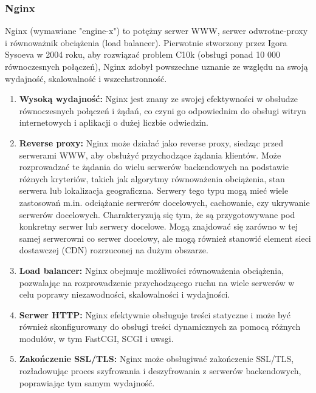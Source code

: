 \subsubsection{Nginx}
Nginx (wymawiane "engine-x") to potężny serwer WWW, serwer odwrotne-proxy i równoważnik obciążenia (load balancer). Pierwotnie stworzony przez Igora Sysoeva w 2004 roku, aby rozwiązać problem C10k (obsługi ponad 10 000 równoczesnych połączeń), Nginx zdobył powszechne uznanie ze względu na swoją wydajność, skalowalność i wszechstronność.
\\


\begin{enumerate}
\item {\bf Wysoką wydajność: }
Nginx jest znany ze swojej efektywności w obsłudze równoczesnych połączeń i żądań, co czyni go odpowiednim do obsługi witryn internetowych i aplikacji o dużej liczbie odwiedzin.

\item {\bf Reverse proxy:}
Nginx może działać jako reverse proxy, siedząc przed serwerami WWW, aby obsłużyć przychodzące żądania klientów. Może rozprowadzać te żądania do wielu serwerów backendowych na podstawie różnych kryteriów, takich jak algorytmy równoważenia obciążenia, stan serwera lub lokalizacja geograficzna.
Serwery tego typu mogą mieć wiele zastosowań m.in. odciążanie serwerów docelowych, cachowanie, czy ukrywanie serwerów docelowych. Charakteryzują się tym, że są przygotowywane pod konkretny serwer lub serwery docelowe. Mogą znajdować się zarówno w tej samej serwerowni co serwer docelowy, ale mogą również stanowić element sieci dostawczej (CDN) rozrzuconej na dużym obszarze. 

\item {\bf Load balancer: }
Nginx obejmuje możliwości równoważenia obciążenia, pozwalając na rozprowadzenie przychodzącego ruchu na wiele serwerów w celu poprawy niezawodności, skalowalności i wydajności.

\item {\bf Serwer HTTP:} 
Nginx efektywnie obsługuje treści statyczne i może być również skonfigurowany do obsługi treści dynamicznych za pomocą różnych modułów, w tym FastCGI, SCGI i uwsgi.

\item {\bf Zakończenie SSL/TLS:}
Nginx może obsługiwać zakończenie SSL/TLS, rozładowując proces szyfrowania i deszyfrowania z serwerów backendowych, poprawiając tym samym wydajność.


\end{enumerate}
